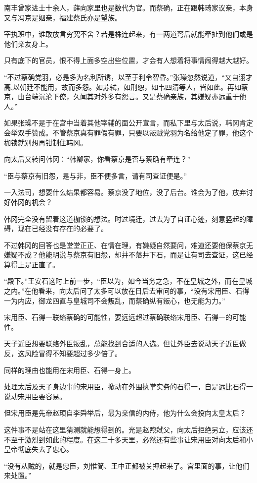 南丰曾家进士十余人，薛向家里也是数代为官。而蔡确，正在跟韩琦家议亲，本身又与冯京是姻亲，福建蔡氏亦是望族。

宰执班中，谁敢放言穷究不舍？若是株连起来，冇一两道弯后就能牵扯到他们或是他们亲友身上。

只有底下的官员，恨不得上面多空出些位置，才会有人想着将事情闹得越大越好。

“不过蔡确党羽，必是多为名利所诱，以至于利令智昏。”张璪忽然说道，“又自诩才高,以朝廷不能用，故而多怨。如苏轼，如刑恕，如韦四清等人，皆如此。再如蔡京，由台端沉沦下僚，久闻其对外多有怨言。又是蔡确亲族，其嫌疑亦远重于他人。”

如果张璪不是于在宫中当着其他宰辅的面公开宣言，而私下里与太后说，韩冈肯定会举双手赞成。不管蔡京真有罪假有罪，只要以叛贼党羽为名给他定了罪，他这个枷锁就别想再钳制住韩冈。

向太后又转问韩冈：“韩卿家，你看蔡京是否与蔡确有牵连？”

“臣与蔡京有旧怨，是与非，臣不便多言，请有司查证便是。”

一入法司，想要什么结果都容易。蔡京没了地位，没了后台。谁会为了他，放弃讨好韩冈的机会？

韩冈完全没有留着这道枷锁的想法。时过境迁，过去为了自证心迹，刻意竖起的障碍，现在已经没有存在的必要了。

不过韩冈的回答也是堂堂正正、在情在理，有嫌疑自然要问，难道还要他保蔡京无嫌疑不成？他能明说与蔡京有旧怨，却并不落井下石，而是让有司去查证，这已经算得上是正直了。

“殿下。”王安石这时上前一步，“臣以为，如今当务之急，不在皇城之外，而在皇城之内。”在他看来，向太后问了太多可以放在日后去审问的事，“没有宋用臣、石得一为内应，御龙四直与皇城司不会叛乱，而蔡确纵有叛心，也无能为力。”

宋用臣、石得一联络蔡确的可能性，要远远超过蔡确联络宋用臣、石得一的可能性。

天子近臣想要联络外臣叛乱，总能找到合适的人选。但让外臣去说动天子近臣做反，这风险冒得不知要超过多少倍了。

同样的理由也能用在宋用臣、石得一身上。

处理太后及天子身边事的宋用臣，掀动在外围执掌实务的石得一，自是远比石得一说动宋用臣要容易。

但宋用臣是先帝赵顼自李舜举后，最为亲信的内侍，他为什么会投向太皇太后？

这件事不是站在这里猜测就能想得到的。光是赵煦弑父，向太后拒绝另立，应该还不至于激烈到如此的程度。在这二十多天里，必然还有些事让宋用臣对向太后和小皇帝彻底失去了忠心。

“没有从贼的，就是忠臣，刘惟简、王中正都被关押起来了。宫里面的事，让他们来处置。”

